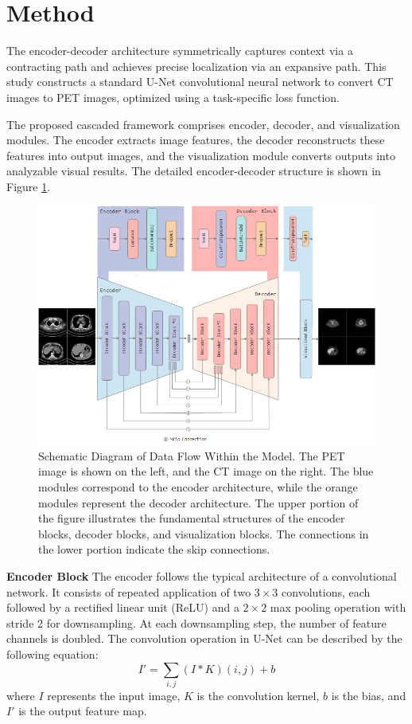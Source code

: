 \documentclass[twocolumn]{article}
\begin{document}
\section{Method}
The encoder-decoder architecture symmetrically captures context via a contracting path and achieves precise localization via an expansive path. This study constructs a standard U-Net convolutional neural network to convert CT images to PET images, optimized using a task-specific loss function.

The proposed cascaded framework comprises encoder, decoder, and visualization modules. The encoder extracts image features, the decoder reconstructs these features into output images, and the visualization module converts outputs into analyzable visual results. The detailed encoder-decoder structure is shown in Figure \ref{fig:Encoder_Decoder_Pair}.

\begin{figure}[t!]
	\centering
	\includegraphics[width=1.0\linewidth]{u-net/lung/Encoder-Decoder-5layer-250406}
	\caption[architecture]{Schematic Diagram of Data Flow Within the Model. The PET image is shown on the left, and the CT image on the right. The blue modules correspond to the encoder architecture, while the orange modules represent the decoder architecture. The upper portion of the figure illustrates the fundamental structures of the encoder blocks, decoder blocks, and visualization blocks. The connections in the lower portion indicate the skip connections.}
	\label{fig:Encoder_Decoder_Pair}
\end{figure}

\textbf{Encoder Block} The encoder follows the typical architecture of a convolutional network. It consists of repeated application of two $3\times3$ convolutions, each followed by a rectified linear unit (ReLU) and a $2\times2$ max pooling operation with stride 2 for downsampling. At each downsampling step, the number of feature channels is doubled. The convolution operation in U-Net can be described by the following equation:
\[
	I' = \sum_{i,j} (I * K)(i,j) + b
\]
where \(I\) represents the input image, \(K\) is the convolution kernel, \(b\) is the bias, and \(I'\) is the output feature map.
\end{document}
